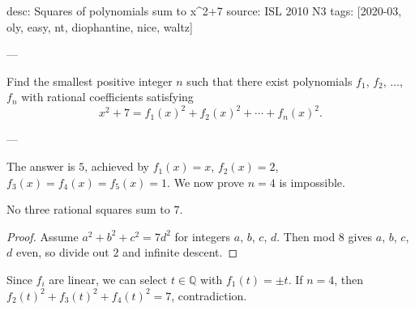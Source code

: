 desc: Squares of polynomials sum to x^2+7
source: ISL 2010 N3
tags: [2020-03, oly, easy, nt, diophantine, nice, waltz]

---

Find the smallest positive integer $n$ such that there exist polynomials $f_1$, $f_2$, $\ldots$, $f_n$ with rational coefficients satisfying \[x^2+7=f_1(x)^2+f_2(x)^2+\cdots+f_n(x)^2.\]

---

The answer is $5$, achieved by $f_1(x)=x$, $f_2(x)=2$, $f_3(x)=f_4(x)=f_5(x)=1$. We now prove $n=4$ is impossible.
\begin{claim*}
    No three rational squares sum to $7$.
\end{claim*}
\begin{proof}
    Assume $a^2+b^2+c^2=7d^2$ for integers $a$, $b$, $c$, $d$. Then mod $8$ gives $a$, $b$, $c$, $d$ even, so divide out $2$ and infinite descent.
\end{proof}

Since $f_i$ are linear, we can select $t\in\mathbb Q$ with $f_1(t)=\pm t$. If $n=4$, then $f_2(t)^2+f_3(t)^2+f_4(t)^2=7$, contradiction.
